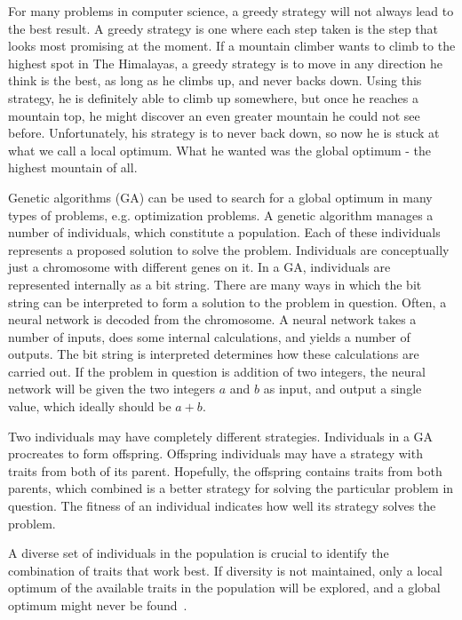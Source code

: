 For many problems in computer science, a greedy strategy will not always lead to the best result.
A greedy strategy is one where each step taken is the step that looks most promising at the moment.
If a mountain climber wants to climb to the highest spot in The Himalayas, a greedy strategy is to move in any direction he think is the best, as long as he climbs up, and never backs down.
Using this strategy, he is definitely able to climb up somewhere, but once he reaches a mountain top, he might discover an even greater mountain he could not see before. Unfortunately, his strategy is to never back down, so now he is stuck at what we call a local optimum. What he wanted was the global optimum - the highest mountain of all.
 
Genetic algorithms (GA) can be used to search for a global optimum in many types of problems, e.g. optimization problems.
A genetic algorithm manages a number of individuals, which constitute a population.
Each of these individuals represents a proposed solution to solve the problem.
Individuals are conceptually just a chromosome with different genes on it.
In a GA, individuals are represented internally as a bit string.
There are many ways in which the bit string can be interpreted to form a solution to the problem in question.
Often, a neural network is decoded from the chromosome. A neural network takes a number of inputs, does some internal calculations, and yields a number of outputs.
The bit string is interpreted determines how these calculations are carried out.
If the problem in question is addition of two integers, the neural network will be given the two integers $a$ and $b$ as input, and output a single value, which ideally should be $a+b$.

Two individuals may have completely different strategies. 
Individuals in a GA procreates to form offspring. Offspring individuals may have a strategy with traits from both of its parent.
Hopefully, the offspring contains traits from both parents, which combined is a better strategy for solving the particular problem in question. The fitness of an individual indicates how well its strategy solves the problem.

A diverse set of individuals in the population is crucial to identify the combination of traits that work best. 
If diversity is not maintained, only a local optimum of the available traits in the population will be explored, and a global optimum might never be found~\cite{ursem2002diversity}.



